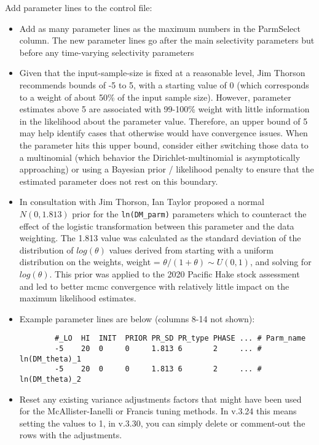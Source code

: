 Add parameter lines to the control file:
\begin{itemize}
	\item Add as many parameter lines as the maximum numbers in the ParmSelect column. The new parameter lines go after the main selectivity parameters but before any time-varying selectivity parameters
	\item Given that the input-sample-size is fixed at a reasonable level,
	Jim Thorson recommends bounds of -5 to 5, with a starting value of 0
	(which corresponds to a weight of about 50\% of the input sample size).
	However, parameter estimates above 5 are associated with 99-100\% weight
	with little information in the likelihood about the parameter value.
	Therefore, an upper bound of 5 may help identify cases that otherwise
	would have convergence issues.  When the parameter hits this upper
	bound, consider either switching those data to a multinomial (which
	behavior the Dirichlet-multinomial is asymptotically approaching) or using a Bayesian prior
	/ likelihood penalty to ensure that the estimated parameter does not
	rest on this boundary.  	
	\item In consultation with Jim Thorson, Ian Taylor proposed a normal
	$N(0, 1.813)$ prior for the \texttt{ln(DM\_parm)} parameters which to
	counteract the effect of the logistic transformation between this
	parameter and the data weighting. The 1.813 value was calculated as the
	standard deviation of the distribution of $log(\theta)$ values derived
	from starting with a uniform distribution on the weights, weight =
	$\theta/(1+\theta) \sim U(0,1)$, and solving for $log(\theta)$. This
	prior was applied to the 2020 Pacific Hake stock assessment
	\citep{grandin-status-2020} and led to better \gls{mcmc} convergence with
	relatively little impact on the maximum likelihood estimates. 
	\item Example parameter lines are below (columns 8-14 not shown): 
    \begin{small}
      \begin{minipage}{\linewidth} 
		\begin{verbatim}
		#_LO  HI  INIT  PRIOR PR_SD PR_type PHASE ... # Parm_name
		-5    20  0     0     1.813 6       2     ... # ln(DM_theta)_1
		-5    20  0     0     1.813 6       2     ... # ln(DM_theta)_2
		\end{verbatim}
      \end{minipage}
    \end{small}
	\item Reset any existing variance adjustments factors that might have been used for the McAllister-Ianelli or Francis tuning methods. In v.3.24 this means setting the values to 1, in v.3.30, you can simply delete or comment-out the rows with the adjustments.
\end{itemize}

